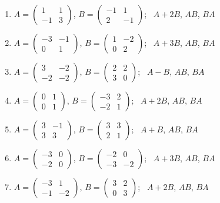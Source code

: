 \begin{enumerate}[label=\arabic*., leftmargin=*]
\item $A=\begin{pmatrix}1 & 1\\ -1 & 3\end{pmatrix}$, $B=\begin{pmatrix}-1 & 1\\ 2 & -1\end{pmatrix}$; \ $A+2B$, $AB$, $BA$
\item $A=\begin{pmatrix}-3 & -1\\ 0 & 1\end{pmatrix}$, $B=\begin{pmatrix}1 & -2\\ 0 & 2\end{pmatrix}$; \ $A+3B$, $AB$, $BA$
\item $A=\begin{pmatrix}3 & -2\\ -2 & -2\end{pmatrix}$, $B=\begin{pmatrix}2 & 2\\ 3 & 0\end{pmatrix}$; \ $A-B$, $AB$, $BA$
\item $A=\begin{pmatrix}0 & 1\\ 0 & 1\end{pmatrix}$, $B=\begin{pmatrix}-3 & 2\\ -2 & 1\end{pmatrix}$; \ $A+2B$, $AB$, $BA$
\item $A=\begin{pmatrix}3 & -1\\ 3 & 3\end{pmatrix}$, $B=\begin{pmatrix}3 & 3\\ 2 & 1\end{pmatrix}$; \ $A+B$, $AB$, $BA$
\item $A=\begin{pmatrix}-3 & 0\\ -2 & 0\end{pmatrix}$, $B=\begin{pmatrix}-2 & 0\\ -3 & -2\end{pmatrix}$; \ $A+3B$, $AB$, $BA$
\item $A=\begin{pmatrix}-3 & 1\\ -1 & -2\end{pmatrix}$, $B=\begin{pmatrix}3 & 2\\ 0 & 3\end{pmatrix}$; \ $A+2B$, $AB$, $BA$

\end{enumerate}
